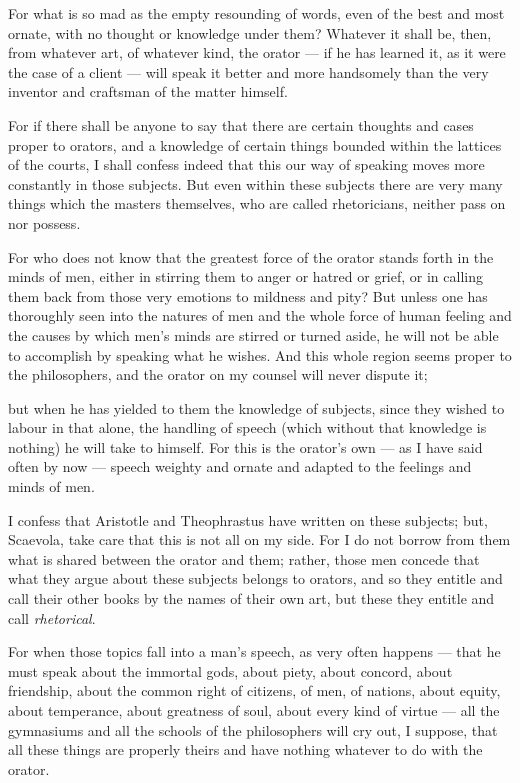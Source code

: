  For what is so mad as the empty resounding of words, even of the best and most ornate, with no thought or knowledge under them? Whatever it shall be, then, from whatever art, of whatever kind, the orator — if he has learned it, as it were the case of a client — will speak it better and more handsomely than the very inventor and craftsman of the matter himself.

 For if there shall be anyone to say that there are certain thoughts and cases proper to orators, and a knowledge of certain things bounded within the lattices of the courts, I shall confess indeed that this our way of speaking moves more constantly in those subjects. But even within these subjects there are very many things which the masters themselves, who are called rhetoricians, neither pass on nor possess.

 For who does not know that the greatest force of the orator stands forth in the minds of men, either in stirring them to anger or hatred or grief, or in calling them back from those very emotions to mildness and pity? But unless one has thoroughly seen into the natures of men and the whole force of human feeling and the causes by which men's minds are stirred or turned aside, he will not be able to accomplish by speaking what he wishes. And this whole region seems proper to the philosophers, and the orator on my counsel will never dispute it;

 but when he has yielded to them the knowledge of subjects, since they wished to labour in that alone, the handling of speech (which without that knowledge is nothing) he will take to himself. For this is the orator's own — as I have said often by now — speech weighty and ornate and adapted to the feelings and minds of men.

 I confess that Aristotle and Theophrastus have written on these subjects; but, Scaevola, take care that this is not all on my side. For I do not borrow from them what is shared between the orator and them; rather, those men concede that what they argue about these subjects belongs to orators, and so they entitle and call their other books by the names of their own art, but these they entitle and call \textit{rhetorical}.

 For when those topics fall into a man's speech, as very often happens — that he must speak about the immortal gods, about piety, about concord, about friendship, about the common right of citizens, of men, of nations, about equity, about temperance, about greatness of soul, about every kind of virtue — all the gymnasiums and all the schools of the philosophers will cry out, I suppose, that all these things are properly theirs and have nothing whatever to do with the orator.

